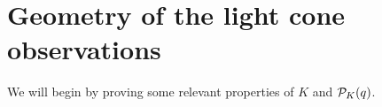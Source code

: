 \section{Geometry of the light cone observations}
We will begin by proving some relevant properties of $K$ and ${\mathcal{P}}_K(q)$.

